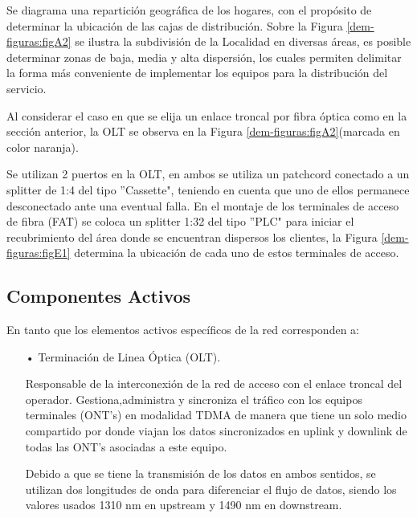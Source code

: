 \begin{enumerate}
Se diagrama una repartición geográfica de los hogares, con el propósito de determinar la ubicación de las cajas de distribución. Sobre la Figura \ref{dem-figuras:figA2} se ilustra la subdivisión de la Localidad en diversas áreas, es posible determinar zonas de baja, media y alta dispersión, los cuales permiten delimitar la forma más conveniente de implementar los equipos para la distribución del servicio.


Al considerar el caso en que se elija un enlace troncal por fibra óptica como en la sección anterior, la OLT se observa en la Figura \ref{dem-figuras:figA2}(marcada en color naranja). 




Se utilizan 2 puertos en la OLT, en ambos se utiliza un patchcord conectado a un splitter de 1:4 del tipo ''Cassette", teniendo en cuenta que uno de ellos permanece desconectado ante una eventual falla. En el montaje de los  terminales de acceso de fibra (FAT) se coloca un splitter 1:32 del tipo ''PLC"  para iniciar el recubrimiento del área donde se encuentran dispersos los clientes, la Figura \ref{dem-figuras:figE1} determina la ubicación de cada uno de estos terminales de acceso.









\subsection{Componentes Activos}
En tanto que los elementos activos específicos de la red corresponden a:
\begin{enumerate}
\item[•]Terminación de Linea Óptica (OLT).

Responsable de la interconexión de la red de acceso con el enlace troncal del operador. Gestiona,administra y sincroniza el tráfico con los equipos terminales (ONT's) en modalidad TDMA de manera que tiene un solo medio compartido por donde viajan los datos sincronizados en uplink y downlink de todas las ONT's asociadas a este equipo.

Debido a que se tiene la transmisión de los datos en ambos sentidos, se utilizan dos longitudes de onda para diferenciar el flujo de datos, siendo los valores usados 1310 nm en upstream y 1490 nm en downstream.





\end{enumerate}
\end{enumerate}
